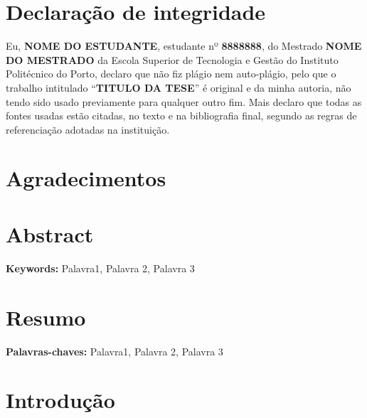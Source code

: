 \documentclass[12pt,a4paper,twoside]{report}
\begin{document}



\chapter*{Declaração de integridade}

Eu, \textbf{NOME DO ESTUDANTE}, estudante nº \textbf{8888888}, do Mestrado \textbf{NOME DO MESTRADO} da Escola Superior de Tecnologia e Gestão do Instituto Politécnico do Porto, declaro que não fiz plágio nem auto-plágio, pelo que o trabalho intitulado “\textbf{TITULO DA TESE}” é original e da minha autoria, não tendo sido usado previamente para qualquer outro fim. Mais declaro que todas as fontes usadas estão citadas, no texto e na bibliografia final, segundo as regras de referenciação adotadas na instituição.

\chapter*{Agradecimentos}

\chapter*{Abstract}

\textbf{Keywords:} Palavra1, Palavra 2, Palavra 3

\chapter*{Resumo}

\textbf{Palavras-chaves:} Palavra1, Palavra 2, Palavra 3

\tableofcontents %

\listoffigures %

\listoftables %

\lstlistoflistings %

\printglossary[type=\acronymtype,title=Acrónimos,nonumberlist] %

\chapter{Introdução}
\end{document}
